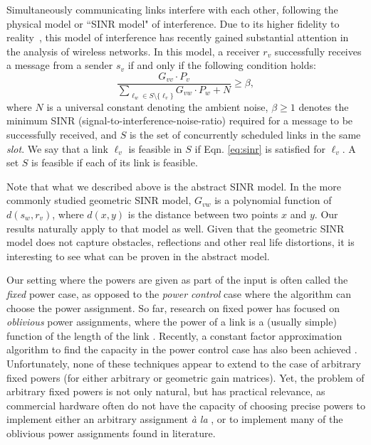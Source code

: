 \documentclass[11pt]{amsart}
\begin{document}
 Simultaneously communicating links interfere with each other,
following the  physical model or ``SINR model" of interference.
Due to its higher fidelity to reality~\cite{GronkMibiHoc01,MaheshwariJD08,Moscibroda2006Protocol},
this model of interference has recently gained substantial  attention in the analysis of wireless networks.
In this model, a receiver $r_v$
successfully receives a message from a sender $s_v$ if and only if the
following condition holds:
\begin{equation}
 \frac{G_{vv} \cdot P_v }{\sum_{\ell_w \in S \setminus  \{\ell_v\}}
   G_{vw} \cdot P_w  + N} \ge \beta, 
 \label{eq:sinr}
\end{equation}
where $N$ is a universal constant denoting the ambient noise, $\beta \ge 1$ denotes the minimum
SINR (signal-to-interference-noise-ratio) required for a message to be successfully received,
and $S$ is the set of concurrently scheduled links in the same \emph{slot}. We say that a link $\ell_v$ is feasible in $S$ if Eqn. \ref{eq:sinr} is satisfied for $\ell_v$.
A set $S$ is feasible if each of its link is feasible.  

Note that what we described above is the abstract SINR model.
In the more commonly studied geometric SINR model, $G_{vw}$ is a polynomial function of $d(s_w, r_v)$,
where $d(x, y)$ is the distance between two points $x$ and $y$. Our results naturally apply to that model
as well. Given that the geometric SINR model does not capture obstacles, reflections and other real life distortions, 
it is interesting to see what can be proven in the abstract model.

Our setting where the powers are given as part of the input is often called the \emph{fixed} power case,
as opposed to the \emph{power control} case where the algorithm can choose the power assignment.
So far, research on fixed power
has focused on \emph{oblivious} power assignments, where the power
of a link is a (usually simple) function of the length of the link \cite{HW09,FKRV09,KV10,SODA11}.
Recently, a constant factor approximation algorithm to find the capacity in the power control case 
has also been achieved \cite{KesselheimSoda11}. Unfortunately, none 
of these techniques appear to extend to the case of arbitrary fixed powers (for either arbitrary or geometric gain matrices). Yet, the problem of arbitrary fixed powers
is not only natural, but has practical relevance, as commercial hardware often do not 
have the capacity of choosing precise powers to implement either an arbitrary assignment \emph{\`{a} la} \cite{KesselheimSoda11}, or to implement many of the oblivious power assignments found in literature.
\end{document}
